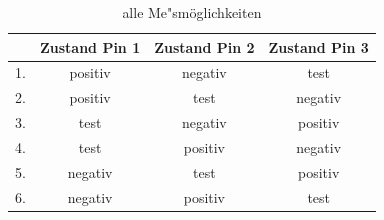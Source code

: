 \begin{table}[H]
  \begin{center}
    \begin{tabular}{| l | c | c | c |}
    \hline
      & Zustand Pin 1 & Zustand Pin 2 & Zustand Pin 3 \\
    \hline
   1. & positiv    &  negativ   &  test \\
   2. & positiv    &  test      & negativ \\
   3. & test       &  negativ   & positiv \\
   4. & test       &  positiv   & negativ \\
   5. & negativ    &  test      & positiv \\
   6. & negativ    &  positiv   &  test  \\
    \hline
    \end{tabular}
  \end{center}
  \caption{alle Me"sm\"oglichkeiten}
  \label{tab:case} 
\end{table}
